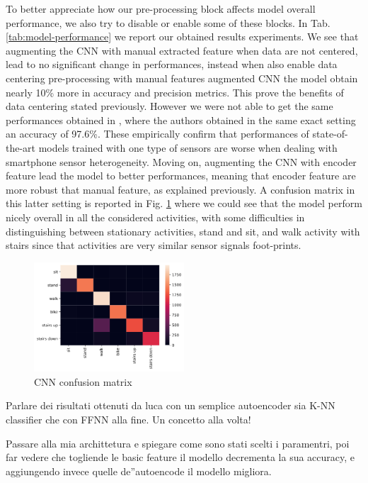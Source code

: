 To better appreciate how our pre-processing block affects model overall performance, we also try to disable or enable some of these blocks. In Tab. \ref{tab:model-performance} we report our obtained results experiments. We see that augmenting the CNN with manual extracted feature when data are not centered, lead to no significant change in performances, instead when also enable data centering pre-processing with manual features augmented CNN the model obtain nearly 10\% more in accuracy and precision metrics. This prove the benefits of data centering stated previously. However we were not able to get the same performances obtained in \cite{ignatov2018real}, where the authors obtained in the same exact setting an accuracy of 97.6\%. These empirically confirm that performances of state-of-the-art models trained with one type of sensors are worse when dealing with smartphone sensor heterogeneity. Moving on, augmenting the CNN with encoder feature lead the model to better performances, meaning that encoder feature are more robust that manual feature, as explained previously. A confusion matrix in this latter setting is reported in Fig. \ref{fig:cnn-confusion-matrix} where we could see that the model perform nicely overall in all the considered activities, with some difficulties in distinguishing between stationary activities, stand and sit, and walk activity with stairs since that activities are very similar sensor signals foot-prints.

\begin{figure}[h]
	\centering
	\includegraphics[width=0.5\textwidth]{images/confusion_matrix.png}
	\caption{CNN confusion matrix}
	\label{fig:cnn-confusion-matrix}
\end{figure}


Parlare dei risultati ottenuti da luca con un semplice autoencoder sia K-NN classifier che con FFNN alla fine. Un concetto alla volta!

Passare alla mia archittetura e spiegare come sono stati scelti i paramentri, poi far vedere che togliende le basic feature il modello decrementa la sua accuracy, e aggiungendo invece quelle de''autoencode il modello migliora. 

